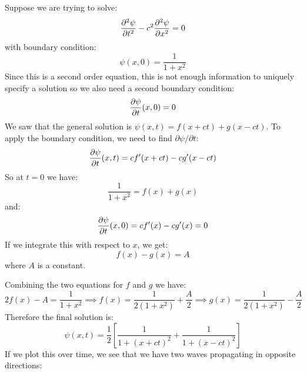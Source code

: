 \documentclass[../main.tex]{subfiles}
\begin{document}
\begin{example}
  Suppose we are trying to solve:
  \[
    \pderiv[2]{\psi}{t} - c^2\pderiv[2]{\psi}{x} = 0
  \]
  with boundary condition:
  \[
    \psi(x, 0) = \frac{1}{1 + x^2}
  \]
  Since this is a second order equation, this is not enough information to uniquely specify a solution so we also need a second boundary condition:
  \[
    \pderiv{\psi}{t}(x, 0) = 0
  \]
  We saw that the general solution is $\psi(x, t) = f(x + ct) + g(x - ct)$.
  To apply the boundary condition, we need to find $\partial \psi / \partial t$:
  \[
    \pderiv{\psi}{t}(x, t) = cf'(x + ct) - cg'(x - ct)
  \]
  So at $t = 0$ we have:
  \[
    \frac{1}{1 + x^2} = f(x) + g(x)
  \]
  and:
  \[
    \pderiv{\psi}{t}(x, 0) = cf'(x) - cg'(x) = 0
  \]
  If we integrate this with respect to $x$, we get:
  \[
    f(x) - g(x) = A
  \]
  where $A$ is a constant.

  Combining the two equations for $f$ and $g$ we have:
  \[
    2f(x) - A = \frac{1}{1 + x^2} \implies f(x) = \frac{1}{2(1 + x^2)} + \frac{A}{2} \implies g(x) = \frac{1}{2(1 + x^2)} - \frac{A}{2}
  \]
  Therefore the final solution is:
  \[
    \psi(x, t) = \frac{1}{2}\left[\frac{1}{1 + (x + ct)^2} + \frac{1}{1 + (x - ct)^2}\right]
  \]
  If we plot this over time, we see that we have two waves propagating in opposite directions:
  \begin{center}
  \end{center}
\end{example}
\end{document}
